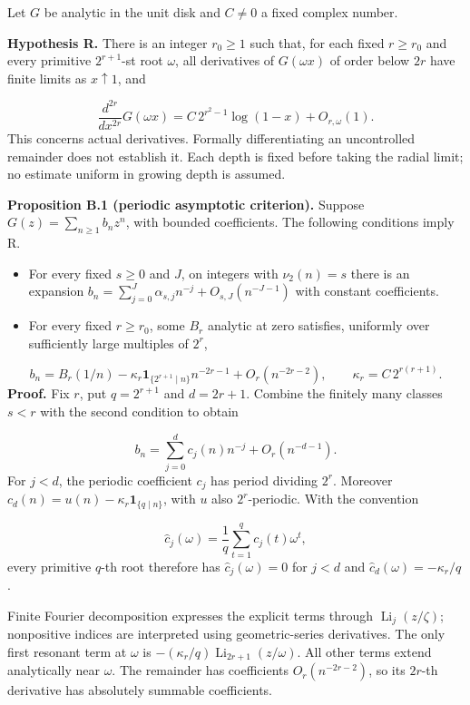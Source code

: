 \documentclass[11pt,a4paper]{article}
\begin{document}
Let $G$ be analytic in the unit disk and $C\ne0$ a fixed complex number.

\textbf{Hypothesis R.} There is an integer $r_0\ge1$ such that, for each fixed $r\ge r_0$ and every primitive $2^{r+1}$-st root $\omega$, all derivatives of $G(\omega x)$ of order below $2r$ have finite limits as $x\uparrow1$, and

\[
\frac{d^{2r}}{dx^{2r}}G(\omega x)
=C\,2^{r^2-1}\log(1-x)+O_{r,\omega}(1).
\]
This concerns actual derivatives. Formally differentiating an uncontrolled remainder does not establish it. Each depth is fixed before taking the radial limit; no estimate uniform in growing depth is assumed.

\textbf{Proposition B.1 (periodic asymptotic criterion).} Suppose $G(z)=\sum_{n\ge1}b_nz^n$, with bounded coefficients. The following conditions imply R.

\begin{itemize}[leftmargin=*]
\item For every fixed $s\ge0$ and $J$, on integers with $\nu_2(n)=s$ there is an expansion $b_n=\sum_{j=0}^J\alpha_{s,j}n^{-j}+O_{s,J}(n^{-J-1})$ with constant coefficients.
\item For every fixed $r\ge r_0$, some $B_r$ analytic at zero satisfies, uniformly over sufficiently large multiples of $2^r$,
\end{itemize}
\[
b_n=B_r(1/n)-\kappa_r\mathbf1_{\{2^{r+1}\mid n\}}n^{-2r-1}
       +O_r(n^{-2r-2}),\qquad
\kappa_r=C\,2^{r(r+1)}.
\]
\textbf{Proof.} Fix $r$, put $q=2^{r+1}$ and $d=2r+1$. Combine the finitely many classes $s<r$ with the second condition to obtain

\[
b_n=\sum_{j=0}^{d}c_j(n)n^{-j}+O_r(n^{-d-1}).
\]
For $j<d$, the periodic coefficient $c_j$ has period dividing $2^r$. Moreover $c_d(n)=u(n)-\kappa_r\mathbf1_{\{q\mid n\}}$, with $u$ also $2^r$-periodic. With the convention

\[
\widehat c_j(\omega)=\frac1q\sum_{t=1}^q c_j(t)\omega^t,
\]
every primitive $q$-th root therefore has $\widehat c_j(\omega)=0$ for $j<d$ and $\widehat c_d(\omega)=-\kappa_r/q$.

Finite Fourier decomposition expresses the explicit terms through $\operatorname{Li}_j(z/\zeta)$; nonpositive indices are interpreted using geometric-series derivatives. The only first resonant term at $\omega$ is $-(\kappa_r/q)\operatorname{Li}_{2r+1}(z/\omega)$. All other terms extend analytically near $\omega$. The remainder has coefficients $O_r(n^{-2r-2})$, so its $2r$-th derivative has absolutely summable coefficients.
\end{document}
